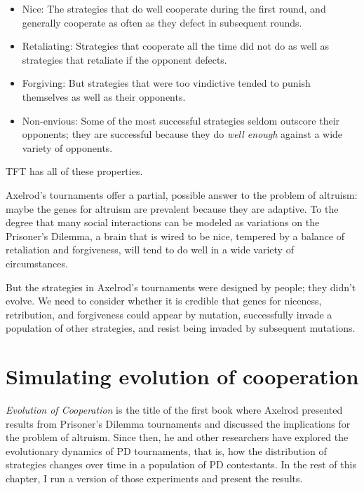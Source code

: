 \documentclass[12pt]{book}
\theoremstyle{exercise}
\begin{document}
\begin{itemize}

\item Nice: The strategies that do well cooperate during the first round, and generally cooperate as often as they defect in subsequent rounds.

\item Retaliating: Strategies that cooperate all the time did not do as well as strategies that retaliate if the opponent defects.

\item Forgiving: But strategies that were too vindictive tended to punish themselves as well as their opponents.

\item Non-envious: Some of the most successful strategies seldom outscore their opponents; they are successful because they do {\em well enough} against a wide variety of opponents.

\end{itemize}

TFT has all of these properties.

Axelrod's tournaments offer a partial, possible answer to the problem of altruism: maybe the genes for altruism are prevalent because they are adaptive.  To the degree that many social interactions can be modeled as variations on the Prisoner's Dilemma, a brain that is wired to be nice, tempered by a balance of retaliation and forgiveness, will tend to do well in a wide variety of circumstances.

But the strategies in Axelrod's tournaments were designed by people; they didn't evolve.  We need to consider whether it is credible that genes for niceness, retribution, and forgiveness could appear by mutation, successfully invade a population of other strategies, and resist being invaded by subsequent mutations.


\section{Simulating evolution of cooperation}

{\em Evolution of Cooperation} is the title of the first book where Axelrod presented results from Prisoner's Dilemma tournaments and discussed the implications for the problem of altruism.  Since then, he and other researchers have explored the evolutionary dynamics of PD tournaments, that is, how the distribution of strategies changes over time in a population of PD contestants.    In the rest of this chapter, I run a version of those experiments and present the results.
\end{document}
